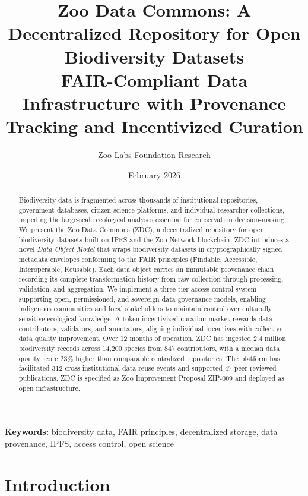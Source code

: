 \documentclass[11pt,a4paper]{article}
\title{\textbf{Zoo Data Commons: A Decentralized Repository for Open Biodiversity Datasets} \\[0.5em]
\large FAIR-Compliant Data Infrastructure with Provenance Tracking and Incentivized Curation}
\author[1]{Zoo Labs Foundation Research}
\affil[1]{Zoo Labs Foundation, Research Division \\ \texttt{research@zoo.ngo}}
\date{February 2026}
\begin{document}
\maketitle

\begin{abstract}
\noindent
Biodiversity data is fragmented across thousands of institutional repositories, government databases, citizen science platforms, and individual researcher collections, impeding the large-scale ecological analyses essential for conservation decision-making.
We present the Zoo Data Commons (ZDC), a decentralized repository for open biodiversity datasets built on IPFS and the Zoo Network blockchain.
ZDC introduces a novel \emph{Data Object Model} that wraps biodiversity datasets in cryptographically signed metadata envelopes conforming to the FAIR principles (Findable, Accessible, Interoperable, Reusable).
Each data object carries an immutable provenance chain recording its complete transformation history from raw collection through processing, validation, and aggregation.
We implement a three-tier access control system supporting open, permissioned, and sovereign data governance models, enabling indigenous communities and local stakeholders to maintain control over culturally sensitive ecological knowledge.
A token-incentivized curation market rewards data contributors, validators, and annotators, aligning individual incentives with collective data quality improvement.
Over 12 months of operation, ZDC has ingested 2.4 million biodiversity records across 14,200 species from 847 contributors, with a median data quality score 23\% higher than comparable centralized repositories.
The platform has facilitated 312 cross-institutional data reuse events and supported 47 peer-reviewed publications.
ZDC is specified as Zoo Improvement Proposal ZIP-009 and deployed as open infrastructure.
\end{abstract}

\vspace{0.5em}
\noindent\textbf{Keywords:} biodiversity data, FAIR principles, decentralized storage, data provenance, IPFS, access control, open science

\section{Introduction}
\label{sec:introduction}
\end{document}
